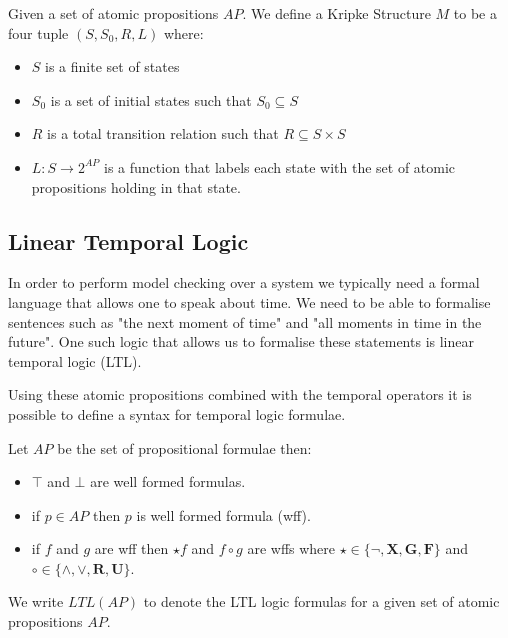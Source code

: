 \begin{mydef}
Given a set of atomic propositions $AP$. We define a Kripke Structure $M$ to be a four tuple $(S, S_0, R, L)$
where:
\begin{itemize} 
\item $S$ is a finite set of states
\item $S_0$ is a set of initial states such that $S_0 \subseteq S$
\item $R$ is a total transition relation such that $R \subseteq S \times S$
\item $L: S \to 2^{AP}$ is a function that labels each state with the set of atomic propositions holding in that state.
\end{itemize}
\end{mydef}

\subsection*{Linear Temporal Logic}

In order to perform model checking over a system we typically need a formal language that allows one to speak about time. We need to be able to formalise sentences such as "the next moment of time" and "all moments in time in the future". One such logic that allows us to formalise these statements is linear temporal logic (LTL)\cite{AP77}. 


Using these atomic propositions combined with the temporal operators it is possible to define a syntax for temporal logic formulae.

\begin{mydef}
Let $AP$ be the set of propositional formulae then:

\begin{itemize}
\item $\top$ and $\bot$ are well formed formulas.
\item if $p \in AP$ then $p$ is well formed formula (wff).

\item if $f$ and $g$ are wff  then $\star f$ and $f \circ g$ are wffs where $\star \in \{\neg,\mathbf{X},\mathbf{G}, \mathbf{F}\}$ and $\circ \in \{ \wedge,\vee,\textbf{R},\textbf{U} \}$.
\end{itemize}

\end{mydef}
We write $LTL(AP)$ to denote the LTL logic formulas for a given set of atomic propositions $AP$.

